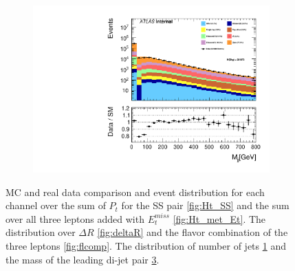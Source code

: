 \begin{figure}
{\begin{subfigure}{.425\textwidth}
        \caption{}
        \label{fig:njet_SG}
    \end{subfigure}
    \hfill
    \begin{subfigure}{.425\textwidth}
        \includegraphics[width=\textwidth]{Figures/FeaturesHistograms/M_jj.pdf}
        \caption{}
        \label{fig:M_jj}
    \end{subfigure}
    }
    \caption{\ac{MC} and real data comparison and event distribution for each channel over the sum of $P_t$
    for the SS pair \ref{fig:Ht_SS} and the sum over all three leptons added with $E_t^{miss}$
    \ref{fig:Ht_met_Et}. The distribution over $\Delta R$ \ref{fig:deltaR} and the flavor 
    combination of the three leptons \ref{fig:flcomp}. The distribution of number of jets 
    \ref{fig:njet_SG} and the mass of the leading di-jet pair \ref{fig:M_jj}.}
\end{figure}
\newpage
